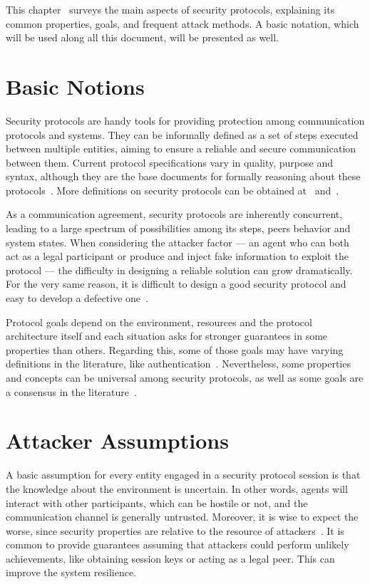 This chapter~\label{chap:sec-protocols} surveys the main aspects of security protocols, explaining its common properties, goals, and frequent attack methods. A basic notation, which will be used along all this document, will be presented as well.





\section{Basic Notions}
Security protocols are handy tools for providing protection among communication protocols and systems. They can be informally defined as a set of steps executed between multiple entities, aiming to ensure a reliable and secure communication between them. Current protocol specifications vary in quality, purpose and syntax, although they are the base documents for formally reasoning about these protocols~\cite{Abadi99}. More definitions on security protocols can be obtained at~\cite{BoydMathuria2008} and~\cite{RyanSchneider2010}.

As a communication agreement, security protocols are inherently concurrent, leading to a large spectrum of possibilities among its steps, peers behavior and system states. When considering the attacker factor --- an agent who can both act as a legal participant or produce and inject fake information to exploit the protocol --- the difficulty in designing a reliable solution can grow dramatically. For the very same reason, it is difficult to design a good security protocol and easy to develop a defective one~\cite{Bella2007}.

Protocol goals depend on the environment, resources and the protocol architecture itself and each situation asks for stronger guarantees in some properties than others. Regarding this, some of those goals may have varying definitions in the literature, like authentication~\cite{Abadi99}. Nevertheless, some properties and concepts can be universal among security protocols, as well as some goals are a consensus in the literature~\cite{RyanSchneider2010}.





\section{Attacker Assumptions}
A basic assumption for every entity engaged in a security protocol session is that the knowledge about the environment is uncertain. In other words, agents will interact with other participants, which can be hostile or not, and the communication channel is generally untrusted. Moreover, it is wise to expect the worse, since security properties are relative to the resource of attackers~\cite{BoydMathuria2008}. It is common to provide guarantees assuming that attackers could perform unlikely achievements, like obtaining session keys or acting as a legal peer. This can improve the system resilience.

